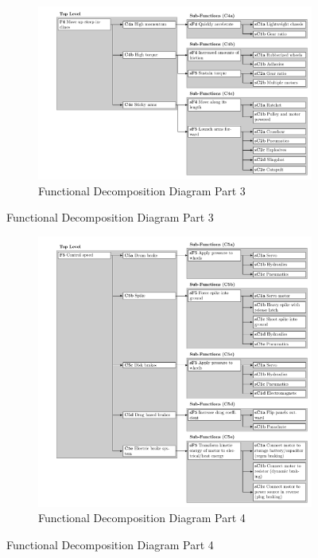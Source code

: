 \documentclass[class=../../report, crop=false]{standalone}
\begin{document}
\begin{figure}[!htb]
	\ContinuedFloat
	\begin{subfigure}{\textwidth}
		\centering
		\includegraphics[width=\textwidth]{../../../bin/funcdecomp-3}
		\caption{Functional Decomposition Diagram Part 3}
	\end{subfigure}
\end{figure}

\begin{figure}[!htb]
	\ContinuedFloat
	\begin{subfigure}{\textwidth}
		\centering
		\includegraphics[width=\textwidth]{../../../bin/funcdecomp-4}
		\caption{Functional Decomposition Diagram Part 4}
	\end{subfigure}
\end{figure}
\end{document}
